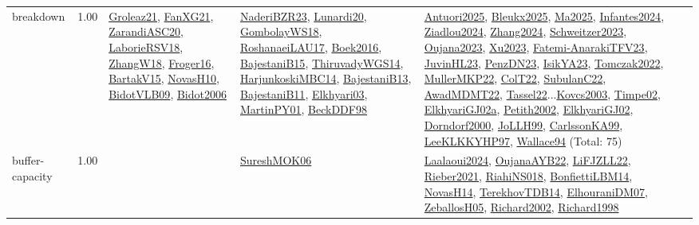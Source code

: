 {\begin{longtable}{p{3cm}r>{\raggedright\arraybackslash}p{6cm}>{\raggedright\arraybackslash}p{6cm}>{\raggedright\arraybackslash}p{8cm}}
\index{breakdown}\index{Concepts!breakdown}breakdown &  1.00 & \hyperref[detail:Groleaz21]{Groleaz21}, \hyperref[detail:FanXG21]{FanXG21}, \hyperref[detail:ZarandiASC20]{ZarandiASC20}, \hyperref[detail:LaborieRSV18]{LaborieRSV18}, \hyperref[detail:ZhangW18]{ZhangW18}, \hyperref[detail:Froger16]{Froger16}, \hyperref[detail:BartakV15]{BartakV15}, \hyperref[detail:NovasH10]{NovasH10}, \hyperref[detail:BidotVLB09]{BidotVLB09}, \hyperref[detail:Bidot2006]{Bidot2006} & \hyperref[detail:NaderiBZR23]{NaderiBZR23}, \hyperref[detail:Lunardi20]{Lunardi20}, \hyperref[detail:GombolayWS18]{GombolayWS18}, \hyperref[detail:RoshanaeiLAU17]{RoshanaeiLAU17}, \hyperref[detail:Boek2016]{Boek2016}, \hyperref[detail:BajestaniB15]{BajestaniB15}, \hyperref[detail:ThiruvadyWGS14]{ThiruvadyWGS14}, \hyperref[detail:HarjunkoskiMBC14]{HarjunkoskiMBC14}, \hyperref[detail:BajestaniB13]{BajestaniB13}, \hyperref[detail:BajestaniB11]{BajestaniB11}, \hyperref[detail:Elkhyari03]{Elkhyari03}, \hyperref[detail:MartinPY01]{MartinPY01}, \hyperref[detail:BeckDDF98]{BeckDDF98} & \hyperref[detail:Antuori2025]{Antuori2025}, \hyperref[detail:Bleukx2025]{Bleukx2025}, \hyperref[detail:Ma2025]{Ma2025}, \hyperref[detail:Infantes2024]{Infantes2024}, \hyperref[detail:Ziadlou2024]{Ziadlou2024}, \hyperref[detail:Zhang2024]{Zhang2024}, \hyperref[detail:Schweitzer2023]{Schweitzer2023}, \hyperref[detail:Oujana2023]{Oujana2023}, \hyperref[detail:Xu2023]{Xu2023}, \hyperref[detail:Fatemi-AnarakiTFV23]{Fatemi-AnarakiTFV23}, \hyperref[detail:JuvinHL23]{JuvinHL23}, \hyperref[detail:PenzDN23]{PenzDN23}, \hyperref[detail:IsikYA23]{IsikYA23}, \hyperref[detail:Tomczak2022]{Tomczak2022}, \hyperref[detail:MullerMKP22]{MullerMKP22}, \hyperref[detail:ColT22]{ColT22}, \hyperref[detail:SubulanC22]{SubulanC22}, \hyperref[detail:AwadMDMT22]{AwadMDMT22}, \hyperref[detail:Tassel22]{Tassel22}...\hyperref[detail:Kovcs2003]{Kovcs2003}, \hyperref[detail:Timpe02]{Timpe02}, \hyperref[detail:ElkhyariGJ02a]{ElkhyariGJ02a}, \hyperref[detail:Petith2002]{Petith2002}, \hyperref[detail:ElkhyariGJ02]{ElkhyariGJ02}, \hyperref[detail:Dorndorf2000]{Dorndorf2000}, \hyperref[detail:JoLLH99]{JoLLH99}, \hyperref[detail:CarlssonKA99]{CarlssonKA99}, \hyperref[detail:LeeKLKKYHP97]{LeeKLKKYHP97}, \hyperref[detail:Wallace94]{Wallace94} (Total: 75)\\
\index{buffer-capacity}\index{Concepts!buffer-capacity}buffer-capacity &  1.00 &  & \hyperref[detail:SureshMOK06]{SureshMOK06} & \hyperref[detail:Laalaoui2024]{Laalaoui2024}, \hyperref[detail:OujanaAYB22]{OujanaAYB22}, \hyperref[detail:LiFJZLL22]{LiFJZLL22}, \hyperref[detail:Rieber2021]{Rieber2021}, \hyperref[detail:RiahiNS018]{RiahiNS018}, \hyperref[detail:BonfiettiLBM14]{BonfiettiLBM14}, \hyperref[detail:NovasH14]{NovasH14}, \hyperref[detail:TerekhovTDB14]{TerekhovTDB14}, \hyperref[detail:ElhouraniDM07]{ElhouraniDM07}, \hyperref[detail:ZeballosH05]{ZeballosH05}, \hyperref[detail:Richard2002]{Richard2002}, \hyperref[detail:Richard1998]{Richard1998}\\

\end{longtable}}
